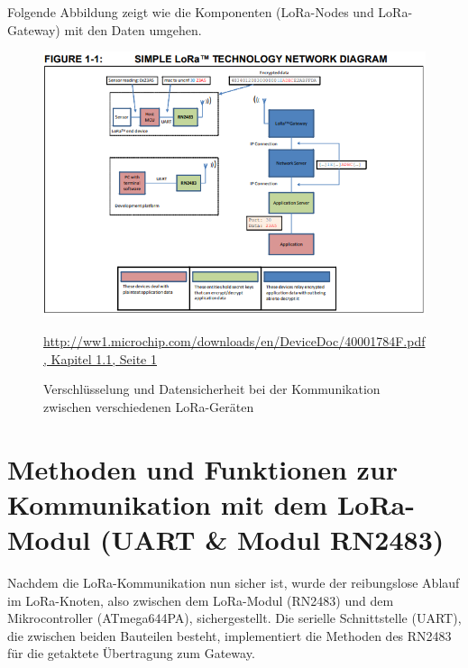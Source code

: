 \noindent
Folgende Abbildung zeigt wie die Komponenten (LoRa-Nodes und LoRa-Gateway) mit den Daten umgehen.
\begin{figure}[H]
    \center
    \includegraphics[width=15cm]{Bilder/lora-11.png}\\
    \caption{Verschlüsselung und Datensicherheit bei der Kommunikation zwischen verschiedenen LoRa-Geräten}
    \begin{center} \quelle\url{http://ww1.microchip.com/downloads/en/DeviceDoc/40001784F.pdf, Kapitel 1.1, Seite 1} \end{center}
        \label{fig:security}
\end{figure}
\section{Methoden und Funktionen zur Kommunikation mit dem LoRa-Modul (UART \& Modul RN2483)}
Nachdem die LoRa-Kommunikation nun sicher ist, wurde der reibungslose Ablauf im LoRa-Knoten, also zwischen dem LoRa-Modul (RN2483) und dem Mikrocontroller (ATmega644PA), sichergestellt.
Die serielle Schnittstelle (UART), die zwischen beiden Bauteilen besteht, implementiert die Methoden des RN2483 für die getaktete Übertragung zum Gateway.
